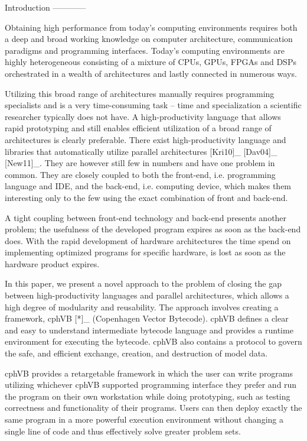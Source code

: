 
Introduction
------------

Obtaining high performance from today's computing environments requires both a deep and broad working knowledge on computer architecture, communication paradigms and programming interfaces. Today's computing environments are highly heterogeneous consisting of a mixture of CPUs, GPUs, FPGAs and DSPs orchestrated in a wealth of architectures and lastly connected in numerous ways.

Utilizing this broad range of architectures manually requires programming specialists and is a very time-consuming task – time and specialization a scientific researcher typically does not have. A high-productivity language that allows rapid prototyping and still enables efficient utilization of a broad range of architectures is clearly preferable. 
There exist high-productivity language and libraries that automatically utilize parallel architectures [Kri10]_ [Dav04]_ [New11]_. They are however still few in numbers and have one problem in common. They are closely coupled to both the front-end, i.e. programming language and IDE, and the back-end, i.e. computing device, which makes them interesting only to the few using the exact combination of front and back-end.

A tight coupling between front-end technology and back-end presents another problem; the usefulness of the developed program expires as soon as the back-end does. With the rapid development of hardware architectures the time spend on implementing optimized programs for specific hardware, is lost as soon as the hardware product expires.
 
In this paper, we present a novel approach to the problem of closing the gap between high-productivity languages and parallel architectures, which allows a high degree of modularity and reusability. The approach involves creating a framework, cphVB [*]_ (Copenhagen Vector Bytecode). cphVB defines a clear and easy to understand intermediate bytecode language and provides a runtime environment for executing the bytecode. cphVB also contains a protocol to govern the safe, and efficient exchange, creation, and destruction of model data.

cphVB provides a retargetable framework in which the user can write programs utilizing whichever cphVB supported programming interface they prefer and run the program on their own workstation while doing prototyping, such as testing correctness and functionality of their programs. Users can then deploy exactly the same program in a more powerful execution environment without changing a single line of code and thus effectively solve greater problem sets.

